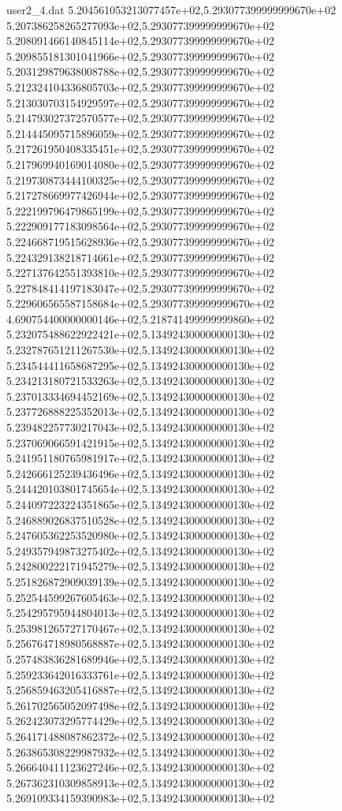 \begin{filecontents}{user2_4.dat}
5.204561053213077457e+02,5.293077399999999670e+02
5.207386258265277093e+02,5.293077399999999670e+02
5.208091466140845114e+02,5.293077399999999670e+02
5.209855181301041966e+02,5.293077399999999670e+02
5.203129879638008788e+02,5.293077399999999670e+02
5.212324104336805703e+02,5.293077399999999670e+02
5.213030703154929597e+02,5.293077399999999670e+02
5.214793027372570577e+02,5.293077399999999670e+02
5.214445095715896059e+02,5.293077399999999670e+02
5.217261950408335451e+02,5.293077399999999670e+02
5.217969940169014080e+02,5.293077399999999670e+02
5.219730873444100325e+02,5.293077399999999670e+02
5.217278669977426944e+02,5.293077399999999670e+02
5.222199796479865199e+02,5.293077399999999670e+02
5.222909177183098564e+02,5.293077399999999670e+02
5.224668719515628936e+02,5.293077399999999670e+02
5.224329138218714661e+02,5.293077399999999670e+02
5.227137642551393810e+02,5.293077399999999670e+02
5.227848414197183047e+02,5.293077399999999670e+02
5.229606565587158684e+02,5.293077399999999670e+02
4.690754400000000146e+02,5.218741499999999860e+02
5.232075488622922421e+02,5.134924300000000130e+02
5.232787651211267530e+02,5.134924300000000130e+02
5.234544411658687295e+02,5.134924300000000130e+02
5.234213180721533263e+02,5.134924300000000130e+02
5.237013334694452169e+02,5.134924300000000130e+02
5.237726888225352013e+02,5.134924300000000130e+02
5.239482257730217043e+02,5.134924300000000130e+02
5.237069066591421915e+02,5.134924300000000130e+02
5.241951180765981917e+02,5.134924300000000130e+02
5.242666125239436496e+02,5.134924300000000130e+02
5.244420103801745654e+02,5.134924300000000130e+02
5.244097223224351865e+02,5.134924300000000130e+02
5.246889026837510528e+02,5.134924300000000130e+02
5.247605362253520980e+02,5.134924300000000130e+02
5.249357949873275402e+02,5.134924300000000130e+02
5.242800222171945279e+02,5.134924300000000130e+02
5.251826872909039139e+02,5.134924300000000130e+02
5.252544599267605463e+02,5.134924300000000130e+02
5.254295795944804013e+02,5.134924300000000130e+02
5.253981265727170467e+02,5.134924300000000130e+02
5.256764718980568887e+02,5.134924300000000130e+02
5.257483836281689946e+02,5.134924300000000130e+02
5.259233642016333761e+02,5.134924300000000130e+02
5.256859463205416887e+02,5.134924300000000130e+02
5.261702565052097498e+02,5.134924300000000130e+02
5.262423073295774429e+02,5.134924300000000130e+02
5.264171488087862372e+02,5.134924300000000130e+02
5.263865308229987932e+02,5.134924300000000130e+02
5.266640411123627246e+02,5.134924300000000130e+02
5.267362310309858913e+02,5.134924300000000130e+02
5.269109334159390983e+02,5.134924300000000130e+02

\end{filecontents}

